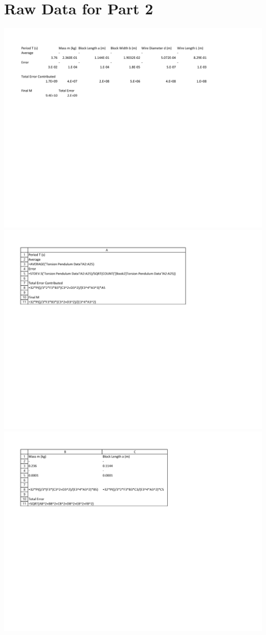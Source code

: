 \documentclass[leqno]{article}
\begin{document}
\section*{Raw Data for Part 2}
\includegraphics[width=\linewidth]{lab1datac}
\includegraphics[width=\linewidth]{lab1datacf1}
\includegraphics[width=\linewidth]{lab1datacf2}
\end{document}
